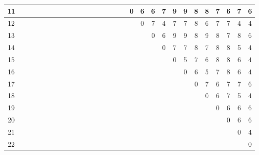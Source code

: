 \documentclass[a4paper,12pt]{article}
\begin{document}
\begin{table}[H]
\begin{tabular}{|c|c|c|c|c|c|c|c|c|c|c|c|c|c|c|c|c|c|c|c|c|c|c|}
        11 & ~ & ~ & ~ & ~ & ~ & ~ & ~ & ~ & ~ & ~ & 0 & 6 & 6 & 7 & 9 & 9 & 8 & 8 & 7 & 6 & 7 & 6 \\ \hline
        12 & ~ & ~ & ~ & ~ & ~ & ~ & ~ & ~ & ~ & ~ & ~ & 0 & 7 & 4 & 7 & 7 & 8 & 6 & 7 & 7 & 4 & 4 \\ \hline
        13 & ~ & ~ & ~ & ~ & ~ & ~ & ~ & ~ & ~ & ~ & ~ & ~ & 0 & 6 & 9 & 9 & 8 & 9 & 8 & 7 & 8 & 6 \\ \hline
        14 & ~ & ~ & ~ & ~ & ~ & ~ & ~ & ~ & ~ & ~ & ~ & ~ & ~ & 0 & 7 & 7 & 8 & 7 & 8 & 8 & 5 & 4 \\ \hline
        15 & ~ & ~ & ~ & ~ & ~ & ~ & ~ & ~ & ~ & ~ & ~ & ~ & ~ & ~ & 0 & 5 & 7 & 6 & 8 & 8 & 6 & 4 \\ \hline
        16 & ~ & ~ & ~ & ~ & ~ & ~ & ~ & ~ & ~ & ~ & ~ & ~ & ~ & ~ & ~ & 0 & 6 & 5 & 7 & 8 & 6 & 4 \\ \hline
        17 & ~ & ~ & ~ & ~ & ~ & ~ & ~ & ~ & ~ & ~ & ~ & ~ & ~ & ~ & ~ & ~ & 0 & 7 & 6 & 7 & 7 & 6 \\ \hline
        18 & ~ & ~ & ~ & ~ & ~ & ~ & ~ & ~ & ~ & ~ & ~ & ~ & ~ & ~ & ~ & ~ & ~ & 0 & 6 & 7 & 5 & 4 \\ \hline
        19 & ~ & ~ & ~ & ~ & ~ & ~ & ~ & ~ & ~ & ~ & ~ & ~ & ~ & ~ & ~ & ~ & ~ & ~ & 0 & 6 & 6 & 6 \\ \hline
        20 & ~ & ~ & ~ & ~ & ~ & ~ & ~ & ~ & ~ & ~ & ~ & ~ & ~ & ~ & ~ & ~ & ~ & ~ & ~ & 0 & 6 & 6 \\ \hline
        21 & ~ & ~ & ~ & ~ & ~ & ~ & ~ & ~ & ~ & ~ & ~ & ~ & ~ & ~ & ~ & ~ & ~ & ~ & ~ & ~ & 0 & 4 \\ \hline
        22 & ~ & ~ & ~ & ~ & ~ & ~ & ~ & ~ & ~ & ~ & ~ & ~ & ~ & ~ & ~ & ~ & ~ & ~ & ~ & ~ & ~ & 0 \\ \hline
    \end{tabular}
\end{table}
\end{document}
